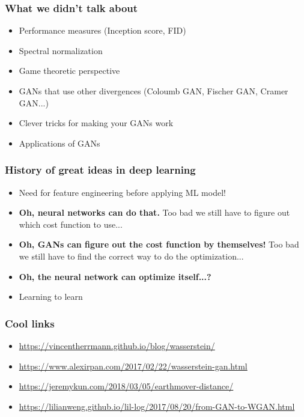 \documentclass{Bredelebeamer}
\begin{document}
\begin{frame}
	\frametitle{What we didn't talk about}
	\begin{itemize}[<+->]
		\item Performance measures (Inception score, FID)
		\item Spectral normalization
		\item Game theoretic perspective
		\item GANs that use other divergences (Coloumb GAN, Fischer GAN, Cramer GAN...)
		\item Clever tricks for making your GANs work
		\item Applications of GANs
	\end{itemize}
\end{frame}
\begin{frame}
\frametitle{History of great ideas in deep learning}

\begin{itemize}[<+(1)->]
	\item Need for feature engineering before applying ML model!
	\item \textbf{Oh, neural networks can do that.} Too bad we still have to figure out which cost function to use...
	\item \textbf{Oh, GANs can figure out the cost function by themselves!} Too bad we still have to find the correct way to do the optimization...
	\item \textbf{Oh, the neural network can optimize itself...?}
	\item Learning to learn 
\end{itemize}

\end{frame}


\begin{frame}
\frametitle{Cool links}

\begin{itemize}
        \item \url{https://vincentherrmann.github.io/blog/wasserstein/}
        \item \url{https://www.alexirpan.com/2017/02/22/wasserstein-gan.html}
        \item \url{https://jeremykun.com/2018/03/05/earthmover-distance/}
        \item \url{https://lilianweng.github.io/lil-log/2017/08/20/from-GAN-to-WGAN.html}
\end{itemize}


\end{frame}
\frametitle{}
\end{document}
